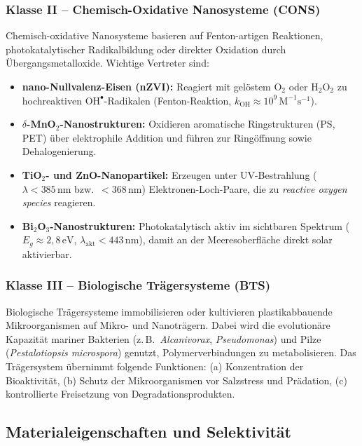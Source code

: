 ﻿\documentclass[12pt,a4paper]{article}
\theoremstyle{definition}
\theoremstyle{remark}
\newcommand{\ROS}{\textit{reactive oxygen species}}
\begin{document}
\subsubsection{Klasse II -- Chemisch-Oxidative Nanosysteme (CONS)}

Chemisch-oxidative Nanosysteme basieren auf Fenton-artigen Reaktionen,
photokatalytischer Radikalbildung oder direkter Oxidation durch Übergangsmetalloxide.
Wichtige Vertreter sind:

\begin{itemize}
  \item \textbf{nano-Nullvalenz-Eisen (nZVI):} Reagiert mit gelöstem O$_2$ oder
        H$_2$O$_2$ zu hochreaktiven $\text{OH}^\bullet$-Radikalen
        (Fenton-Reaktion, $k_{\text{OH}} \approx 10^9\,\text{M}^{-1}\text{s}^{-1}$).
  \item \textbf{$\delta$-MnO$_2$-Nanostrukturen:} Oxidieren aromatische
        Ringstrukturen (PS, PET) über elektrophile Addition und führen zur
        Ringöffnung sowie Dehalogenierung.
  \item \textbf{TiO$_2$- und ZnO-Nanopartikel:} Erzeugen unter UV-Bestrahlung
        ($\lambda < 385\,\text{nm}$ bzw.\ $< 368\,\text{nm}$) Elektronen-Loch-Paare,
        die zu \ROS{} reagieren.
  \item \textbf{Bi$_2$O$_3$-Nanostrukturen:} Photokatalytisch aktiv im
        sichtbaren Spektrum ($E_g \approx 2{,}8\,\text{eV}$,
        $\lambda_{\text{akt}} < 443\,\text{nm}$), damit an der Meeresoberfläche
        direkt solar aktivierbar.
\end{itemize}

\subsubsection{Klasse III -- Biologische Trägersysteme (BTS)}

Biologische Trägersysteme immobilisieren oder kultivieren plastikabbauende
Mikroorganismen auf Mikro- und Nanoträgern. Dabei wird die evolutionäre Kapazität
mariner Bakterien (z.\,B.\ \textit{Alcanivorax}, \textit{Pseudomonas}) und
Pilze (\textit{Pestalotiopsis microspora}) genutzt, Polymerverbindungen zu
metabolisieren. Das Trägersystem übernimmt folgende Funktionen:
(a) Konzentration der Bioaktivität, (b) Schutz der Mikroorganismen vor
Salzstress und Prädation, (c) kontrollierte Freisetzung von Degradationsprodukten.

\subsection{Materialeigenschaften und Selektivität}
\end{document}
